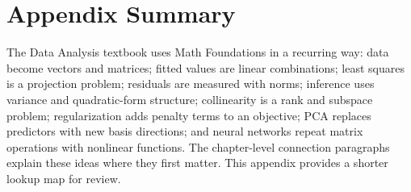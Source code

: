 \section{Appendix Summary}
The Data Analysis textbook uses Math Foundations in a recurring way: data become vectors and matrices; fitted values are linear combinations; least squares is a projection problem; residuals are measured with norms; inference uses variance and quadratic-form structure; collinearity is a rank and subspace problem; regularization adds penalty terms to an objective; PCA replaces predictors with new basis directions; and neural networks repeat matrix operations with nonlinear functions. The chapter-level connection paragraphs explain these ideas where they first matter. This appendix provides a shorter lookup map for review.
